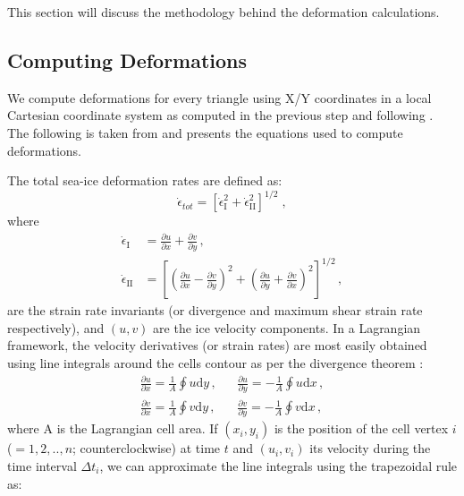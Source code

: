 \documentclass{article}
\begin{document}
    This section will discuss the methodology behind the deformation calculations.

    \subsection{Computing Deformations}

    We compute deformations for every triangle using X/Y coordinates in a local Cartesian coordinate system as computed in the previous step and following \citep{bouchat_reassessing_2020}. The following is taken from \citep{bouchat_reassessing_2020} and presents the equations used to compute deformations.

    The total sea-ice deformation rates are defined as:
    \begin{equation}
        \dot{\epsilon}_{tot} = \left[ \dot{\epsilon}^2_{\mathrm{I}}+\dot{\epsilon}^2_{\mathrm{II}} \right]^{1/2} \;,
    \end{equation}
    where
    \begin{align}
        \dot{\epsilon}_{\mathrm{I}} &= \frac{\partial u}{\partial x}+\frac{\partial v}{\partial y} \, , \label{eq:eps_I} \\
        \dot{\epsilon}_{\mathrm{II}} &= \left[ \left( \frac{\partial u}{\partial x} - \frac{\partial v}{\partial y}\right)^{2} + \left( \frac{\partial u}{\partial y} + \frac{\partial v}{\partial x}\right)^{2}   \right]^{1/2} \, , \label{eq:eps_II}
    \end{align}
    are the strain rate invariants (or divergence and maximum shear strain rate respectively), and $(u,v)$ are the ice velocity components. In a Lagrangian framework, the velocity derivatives (or strain rates) are most easily obtained using line integrals around the cells contour as per the divergence theorem \citep{lindsay_seaice_2003}:
    \begin{align}
        \frac{\partial u}{\partial x}  = \frac{1}{A}\oint u \textrm{d}y \, ,&  & \frac{\partial u}{\partial y}  = -\frac{1}{A}\oint u \textrm{d}x \, , \nonumber \\
        \frac{\partial v}{\partial x}  = \frac{1}{A}\oint v \textrm{d}y \, ,&  & \frac{\partial v}{\partial y}  = -\frac{1}{A}\oint v \textrm{d}x\, ,
        \label{eq:dudx}
    \end{align}
    where A is the Lagrangian cell area. If $(x_{i}, y_{i})$ is the position of the cell vertex $i$ ($=1,2,..,n$; counterclockwise) at time $t$ and $(u_{i}, v_{i})$ its velocity during the time interval $\Delta t_{i}$, we can approximate the line integrals using the trapezoidal rule as:
\end{document}
